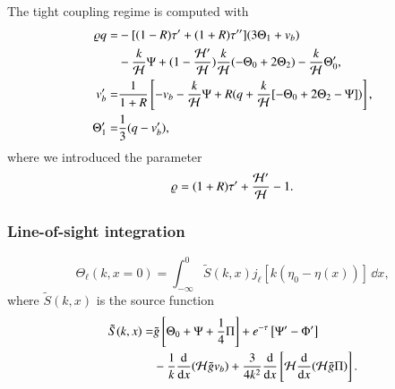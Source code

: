 The tight coupling regime is computed with 
\begin{subequations}
    \begin{align}
        \varrho q =& -[(1-R)\tau' + (1+R)\tau''](3\Theta_1 + v_b) \nonumber \\
            & -\frac{k}{\mathcal{H}}\Psi + (1-\frac{\mathcal{H}'}{\mathcal{H}})\frac{k}{\mathcal{H}}(-\Theta_0 + 2\Theta_2) - \frac{k}{\mathcal{H}}\Theta_0', \\
        v_b' =& \frac{1}{1+R}\left[ -v_b-\frac{k}{\mathcal{H}}\Psi + R(q+\frac{k}{\mathcal{H}}[-\Theta_0+2\Theta_2-\Psi]) \right], \\
        \Theta_1' =& \frac{1}{3}(q-v_b'),
    \end{align}
\end{subequations}
where we introduced the parameter 
\begin{equation}
    \varrho = (1+R)\tau' + \frac{\mathcal{H}'}{\mathcal{H}} - 1.
\end{equation}


\subsubsection{Line-of-sight integration}\label{sssec:M3:theory:line_of_sight_integration}

\begin{equation}
    \Theta_\ell(k,x=0) = \int_{-\infty}^0 \tilde{S}(k,x) j_\ell [k(\eta_0 - \eta(x))]\,\dd x, 
\end{equation}
where $\tilde{S}(k,x)$ is the source function 
\begin{equation}
    \begin{split}
        \tilde{S}(k,x) =& \tilde{g} \left[ \Theta_0 + \Psi + \frac{1}{4} \Pi \right] + e^{-\tau}\left[ \Psi' - \Phi' \right] \\
        & - \frac{1}{k}\dv{x}(\mathcal{H} \tilde{g} v_b) + \frac{3}{4k^2}\dv{x}\left[ \mathcal{H} \dv{x}(\mathcal{H}\tilde{g}\Pi) \right].
    \end{split}
\end{equation}